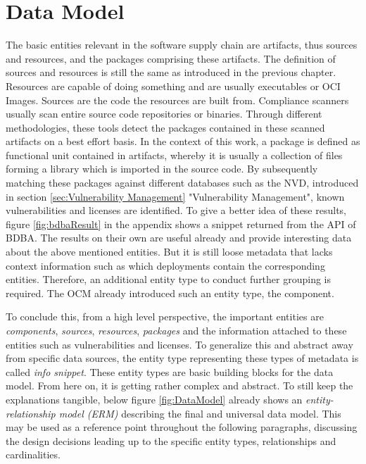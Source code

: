 \section{Data Model} \label{sec:Data Model}
The basic entities relevant in the software supply chain are artifacts, thus sources and resources, and the packages comprising these artifacts. The definition of sources and resources is still the same as introduced in the previous chapter. Resources are capable of doing something and are usually executables or OCI Images. Sources are the code the resources are built from. Compliance scanners usually scan entire source code repositories or binaries. Through different methodologies, these tools detect the packages contained in these scanned artifacts on a best effort basis. In the context of this work, a package is defined as functional unit contained in artifacts, whereby it is usually a collection of files forming a library which is imported in the source code. By subsequently matching these packages against different databases such as the NVD, introduced in section \ref{sec:Vulnerability Management} "Vulnerability Management", known vulnerabilities and licenses are identified. To give a better idea of these results, figure \ref{fig:bdbaResult} in the appendix shows a snippet returned from the API of BDBA. The results on their own are useful already and provide interesting data about the above mentioned entities. But it is still loose metadata that lacks context information such as which deployments contain the corresponding entities. Therefore, an additional entity type to conduct further grouping is required. The OCM already introduced such an entity type, the component.\par
To conclude this, from a high level perspective, the important entities are \emph{components}, \emph{sources}, \emph{resources}, \emph{packages} and the information attached to these entities such as vulnerabilities and licenses. To generalize this and abstract away from specific data sources, the entity type representing these types of metadata is called \emph{info snippet}. These entity types are basic building blocks for the data model. From here on, it is getting rather complex and abstract. To still keep the explanations tangible, below figure \ref{fig:DataModel} already shows an \emph{entity-relationship model (ERM)} %
describing the final and universal data model. This may be used as a reference point throughout the following paragraphs, discussing the design decisions leading up to the specific entity types, relationships and cardinalities.

